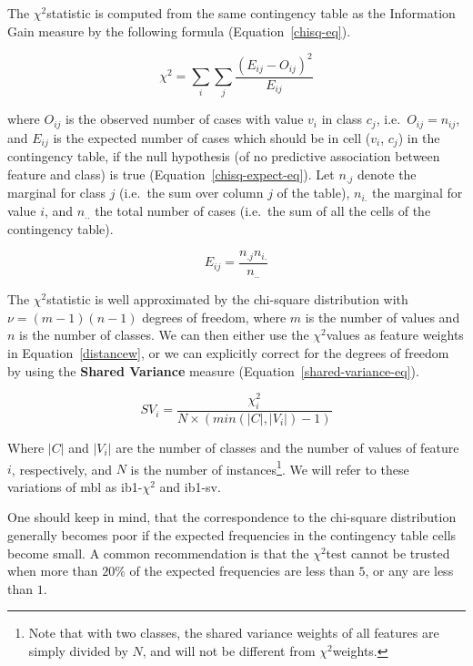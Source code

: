 \documentclass{book}
\newcommand{\chisq}{{$ \chi^2 $}}
\begin{document}
The \chisq statistic is computed from the same contingency table as
the Information Gain measure by the following formula
(Equation~\ref{chisq-eq}).

\begin{equation} 
\chi^{2} = \sum_{i} \sum_{j} \frac{(E_{ij} - O_{ij})^{2}}
				  {E_{ij}} 
\label{chisq-eq}
\end{equation} 

where $O_{ij}$ is the observed number of cases with value $v_{i}$ in
class $c_{j}$, i.e.~$O_{ij} = n_{ij}$, and $E_{ij}$ is the expected
number of cases which should be in cell ($v_{i}$, $c_{j}$) in the
contingency table, if the null hypothesis (of no predictive
association between feature and class) is true
(Equation~\ref{chisq-expect-eq}). Let $n_{.j}$ denote the marginal for
class $j$ (i.e.~the sum over column $j$ of the table), $n_{i.}$ the
marginal for value $i$, and $n_{..}$ the total number of cases
(i.e.~the sum of all the cells of the contingency table).

\begin{equation}
E_{ij} = \frac{n_{.j} n_{i.}}{n_{..}}
\label{chisq-expect-eq}
\end{equation}

The \chisq statistic is well approximated by the chi-square
distribution with $\nu = (m-1)(n-1)$ degrees of freedom, where $m$ is
the number of values and $n$ is the number of classes. We can then
either use the \chisq values as feature weights in
Equation~\ref{distancew}, or we can explicitly correct for the degrees
of freedom by using the {\bf Shared Variance} measure
(Equation~\ref{shared-variance-eq}).

\begin{equation}
SV_{i} = \frac{ \chi^2_{i}}{N \times ( min(|C|,|V_{i}|)-1 ) }
\label{shared-variance-eq}
\end{equation}

Where $|C|$ and $|V_{i}|$ are the number of classes and the number of
values of feature $i$, respectively, and $N$ is the number of
instances\footnote{Note that with two classes, the shared variance
weights of all features are simply divided by $N$, and will not be
different from \chisq weights.}. We will refer to these
variations of {\sc mbl} as {\sc ib1-\chisq} and {\sc ib1-sv}.

One should keep in mind, that the correspondence to the chi-square
distribution generally becomes poor if the expected frequencies in the
contingency table cells become small. A common recommendation is that
the \chisq test cannot be trusted when more than $20\%$ of the
expected frequencies are less than $5$, or any are less than $1$.
\end{document}
